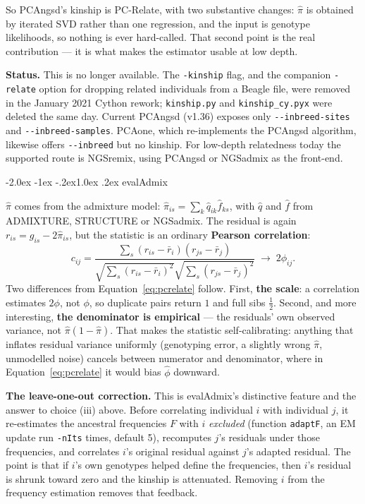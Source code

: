 \documentclass[10pt,a4paper]{article}
\makeatletter
\renewcommand\subsection{\@startsection{subsection}{2}{\z@}%
  {-2.0ex \@plus -1ex \@minus -.2ex}{1.0ex \@plus.2ex}%
  {\normalfont\normalsize\bfseries\color{hdr}}}
\makeatother
\begin{document}
So PCAngsd's kinship is PC-Relate, with two substantive changes: $\hat\pi$ is obtained by iterated SVD
rather than one regression, and the input is genotype likelihoods, so nothing is ever hard-called. That
second point is the real contribution --- it is what makes the estimator usable at low depth.

\textbf{Status.} This is no longer available. The \texttt{-kinship} flag, and the companion \texttt{-relate}
option for dropping related individuals from a Beagle file, were removed in the January 2021 Cython rework;
\texttt{kinship.py} and \texttt{kinship\_cy.pyx} were deleted the same day. Current PCAngsd (v1.36) exposes
only \texttt{-{}-inbreed-sites} and \texttt{-{}-inbreed-samples}. PCAone, which re-implements the PCAngsd
algorithm, likewise offers \texttt{-{}-inbreed} but no kinship. For low-depth relatedness today the
supported route is NGSremix, using PCAngsd or NGSadmix as the front-end.

\subsection{evalAdmix}

$\hat\pi$ comes from the admixture model: $\hat\pi_{is}=\sum_k \hat q_{ik}\hat f_{ks}$, with $\hat q$ and
$\hat f$ from ADMIXTURE, STRUCTURE or NGSadmix. The residual is again $r_{is}=g_{is}-2\hat\pi_{is}$, but the
statistic is an ordinary \textbf{Pearson correlation}:
\begin{equation}
c_{ij}=\frac{\sum_s (r_{is}-\bar r_i)(r_{js}-\bar r_j)}
{\sqrt{\sum_s (r_{is}-\bar r_i)^2}\sqrt{\sum_s (r_{js}-\bar r_j)^2}}
\;\longrightarrow\; 2\phi_{ij}.
\label{eq:evaladmix}
\end{equation}
Two differences from Equation~\eqref{eq:pcrelate} follow. First, \textbf{the scale}: a correlation estimates
$2\phi$, not $\phi$, so duplicate pairs return $1$ and full sibs $\tfrac12$. Second, and more interesting,
\textbf{the denominator is empirical} --- the residuals' own observed variance, not
$\hat\pi(1-\hat\pi)$. That makes the statistic self-calibrating: anything that inflates residual variance
uniformly (genotyping error, a slightly wrong $\hat\pi$, unmodelled noise) cancels between numerator and
denominator, where in Equation~\eqref{eq:pcrelate} it would bias $\hat\phi$ downward.

\textbf{The leave-one-out correction.} This is evalAdmix's distinctive feature and the answer to choice
(iii) above. Before correlating individual $i$ with individual $j$, it re-estimates the ancestral frequencies
$F$ with $i$ \emph{excluded} (function \texttt{adaptF}, an EM update run \texttt{-nIts} times, default 5),
recomputes $j$'s residuals under those frequencies, and correlates $i$'s original residual against $j$'s
adapted residual. The point is that if $i$'s own genotypes helped define the frequencies, then $i$'s residual
is shrunk toward zero and the kinship is attenuated. Removing $i$ from the frequency estimation removes that
feedback.
\end{document}

